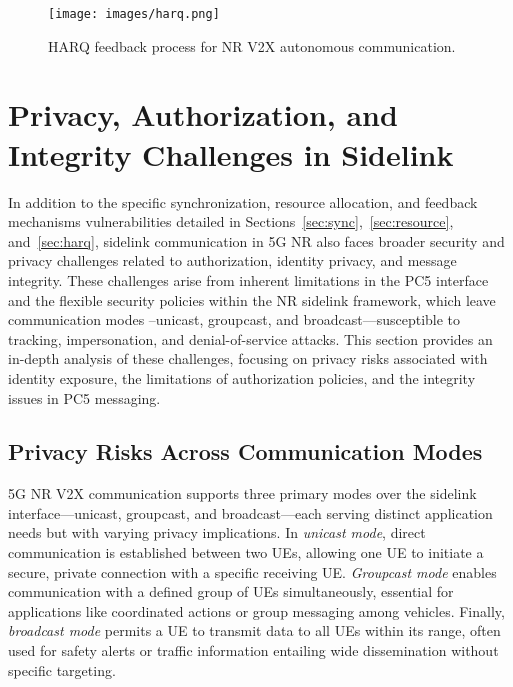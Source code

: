 \begin{figure}[!t]
     \centering
     \texttt{[image: images/harq.png]}
     \caption{HARQ feedback process for NR V2X autonomous communication.}
     \label{fig:harq}
\end{figure}

\section{Privacy, Authorization, and Integrity Challenges in Sidelink} \label{sec:general}

In addition to the specific synchronization, resource allocation, and feedback mechanisms vulnerabilities detailed in Sections~\ref{sec:sync},~\ref{sec:resource}, and~\ref{sec:harq}, sidelink communication in 5G NR also faces broader security and privacy challenges related to authorization, identity privacy, and message integrity. These challenges arise from inherent limitations in the PC5 interface and the flexible security policies within the NR sidelink framework, which leave communication modes --unicast, groupcast, and broadcast—susceptible to tracking, impersonation, and denial-of-service attacks. This section provides an in-depth analysis of these challenges, focusing on privacy risks associated with identity exposure, the limitations of authorization policies, and the integrity issues in PC5 messaging.

\subsection{Privacy Risks Across Communication Modes}

5G NR V2X communication supports three primary modes over the sidelink interface—unicast, groupcast, and broadcast—each serving distinct application needs but with varying privacy implications. In \emph{unicast mode}, direct communication is established between two UEs, allowing one UE to initiate a secure, private connection with a specific receiving UE. \emph{Groupcast mode} enables communication with a defined group of UEs simultaneously, essential for applications like coordinated actions or group messaging among vehicles. Finally, \emph{broadcast mode} permits a UE to transmit data to all UEs within its range, often used for safety alerts or traffic information entailing wide dissemination without specific targeting.

